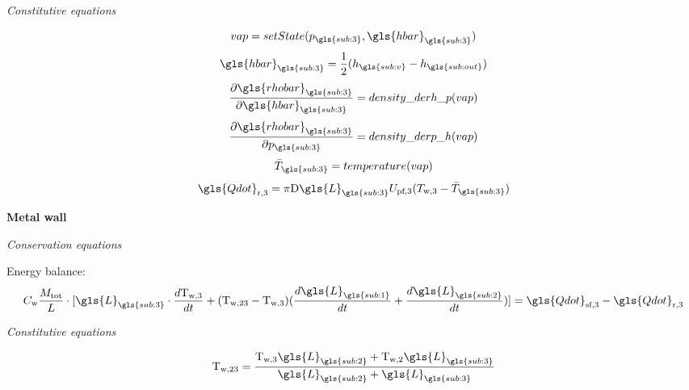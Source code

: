 \documentclass[11pt]{article} %
\begin{document}
\begin{center}
\textit{Constitutive equations}\\
\end{center}

\begin{equation}
vap = setState(p_{\gls{sub:3}},\gls{hbar}_{\gls{sub:3}})
\end{equation}
\begin{equation}
\gls{hbar}_{\gls{sub:3}} = \frac{1}{2}(h_{\gls{sub:v}} - h_{\gls{sub:out}})
\end{equation}
\begin{equation}
\frac{\partial \gls{rhobar}_{\gls{sub:3}}}{\partial \gls{hbar}_{\gls{sub:3}}}= density\_derh\_p(vap)
\end{equation}
\begin{equation}
\frac{\partial \gls{rhobar}_{\gls{sub:3}}}{\partial p_{\gls{sub:3}}}= density\_derp\_h(vap)
\end{equation}
\begin{equation}
\bar{T}_{\gls{sub:3}} = temperature(vap)
\end{equation}
\begin{equation}
\gls{Qdot}_\text{r,3} = \pi \text{D} \gls{L}_{\gls{sub:3}} U_\text{pf,3} (T_\text{w,3} - \bar{T}_{\gls{sub:3}})
\end{equation}

{\bf Metal wall}\\
\begin{center}
\textit{Conservation equations}
\end{center}
Energy balance:
\begin{equation}
C_\text{w}\frac{M_\text{tot}}{L} \cdot [ \gls{L}_{\gls{sub:3}} \cdot  \frac{d \text{T}_\text{w,3}}{d t} + (\text{T}_\text{w,23} - \text{T}_\text{w,3})  (\frac{d \gls{L}_{\gls{sub:1}}}{d t} + \frac{d \gls{L}_{\gls{sub:2}}}{d t})]= \gls{Qdot}_\text{sf,3} - \gls{Qdot}_\text{r,3}
\end{equation}

\begin{center}
\textit{Constitutive equations}
\end{center}

\begin{equation}
\text{T}_\text{w,23} = \frac{   \text{T}_\text{w,3} \gls{L}_{\gls{sub:2}}  + \text{T}_\text{w,2}\gls{L}_{\gls{sub:3}}      }{  \gls{L}_{\gls{sub:2}} + \gls{L}_{\gls{sub:3}}         } 
\end{equation}
\end{document}
